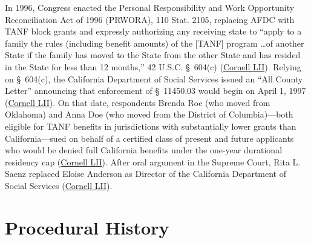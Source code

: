 \documentclass[12pt]{article}
\begin{document}
In 1996, Congress enacted the Personal Responsibility and Work Opportunity Reconciliation Act of 1996 (PRWORA), 110 Stat. 2105, replacing AFDC with TANF block grants and expressly authorizing any receiving state to ``apply to a family the rules (including benefit amounts) of the [TANF] program \ldots of another State if the family has moved to the State from the other State and has resided in the State for less than 12 months,'' 42 U.S.C. \S~604(c) (\href{https://www.law.cornell.edu/supremecourt/text/98-97}{Cornell LII}). Relying on \S~604(c), the California Department of Social Services issued an ``All County Letter'' announcing that enforcement of \S~11450.03 would begin on April 1, 1997 (\href{https://www.law.cornell.edu/supremecourt/text/98-97}{Cornell LII}). On that date, respondents Brenda Roe (who moved from Oklahoma) and Anna Doe (who moved from the District of Columbia)---both eligible for TANF benefits in jurisdictions with substantially lower grants than California---sued on behalf of a certified class of present and future applicants who would be denied full California benefits under the one-year durational residency cap (\href{https://www.law.cornell.edu/supremecourt/text/98-97}{Cornell LII}). After oral argument in the Supreme Court, Rita L. Saenz replaced Eloise Anderson as Director of the California Department of Social Services (\href{https://www.law.cornell.edu/supremecourt/text/98-97}{Cornell LII}).

\section{Procedural History}
\end{document}
